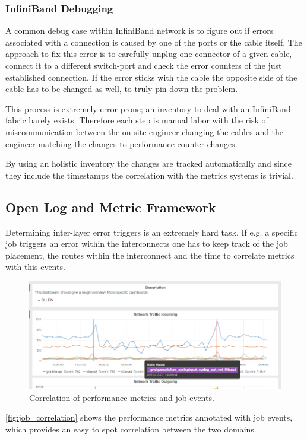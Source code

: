 \subsubsection{InfiniBand Debugging}
A common debug case within InfiniBand network is to figure out if errors associated with a connection is caused by one of the ports or the cable itself.
The approach to fix this error is to carefully unplug one connector of a given cable, connect it to a different switch-port and check the error counters of the just established connection.
If the error sticks with the cable the opposite side of the cable has to be changed as well, to truly pin down the problem.

This process is extremely error prone; an inventory to deal with an InfiniBand fabric barely exists. Therefore each step is manual labor with the risk of miscommunication between the on-site engineer changing the
cables and the engineer matching the changes to performance counter changes.

By using an holistic inventory the changes are tracked automatically and since they include the timestamps the correlation with the metrics systems is trivial.

\subsection{Open Log and Metric Framework}
Determining inter-layer error triggers is an extremely hard task. If e.g. a specific job triggers an error within the interconnects one has to keep track of the job placement, the routes within the interconnect and
the time to correlate metrics with this events.

\begin{figure}[!ht]
    \includegraphics[width=.4\textwidth]{images/png/mon_cor.png}
    \caption{\label{fig:job_correlation}Correlation of performance metrics and job events.}
\end{figure}
\autoref{fig:job_correlation} shows the performance metrics annotated with job events, which provides an easy to spot correlation between the two domains.

